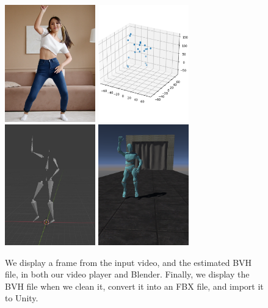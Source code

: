 \begin{figure}[htp]
    \centering
    \includegraphics[width=0.35\textwidth]{figures/Implementation/videoplayer1.png}%
    \qquad
    \includegraphics[width=0.35\textwidth]{figures/Implementation/videoplayer2.png}%
    \qquad
    \includegraphics[width=0.35\textwidth]{figures/Implementation/videoplayer3.png}%
    \qquad
    \includegraphics[width=0.35\textwidth]{figures/Implementation/videoplayer4.png}%
    \captionsetup{labelformat=empty}
    \caption{We display a frame from the input video, and the estimated BVH file, in both our video player and Blender. Finally, we display the BVH file when we clean it, convert it into an FBX file, and import it to Unity.}%
\end{figure}

